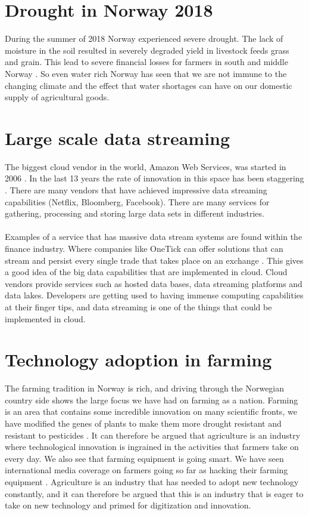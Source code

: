 \documentclass[]{uiophd}
\begin{document}
\section{Drought in Norway 2018}
 During the summer of 2018 Norway experienced severe drought. The lack of moisture in the soil resulted in severely degraded yield in livestock feeds grass and grain. This lead to severe financial losses for farmers in south and middle Norway \cite{nve}. So even water rich Norway has seen that we are not immune to the changing climate and the effect that water shortages can have on our domestic supply of agricultural goods. 

\section{Large scale data streaming }
The biggest cloud vendor in the world, Amazon Web Services, was started in 2006 \cite{Gartner}. In the last 13 years the rate of innovation in this space has been staggering \cite{AWS}. There are many vendors that have achieved impressive data streaming capabilities (Netflix, Bloomberg, Facebook). There are many services for gathering, processing and storing large data sets in different industries.
\\\\
Examples of a service that has massive data stream systems are found within the finance industry. Where companies like OneTick can offer solutions that can stream and persist every single trade that takes place on an exchange  \cite{OneTick}. This gives a good idea of the big data capabilities that are implemented in cloud. Cloud vendors provide services such as hosted data bases, data streaming platforms and data lakes. Developers are getting used to having immense computing capabilities at their finger tips, and data streaming is one of the things that could be implemented in cloud.  
\section{Technology adoption in farming}
The farming tradition in Norway is rich, and driving through the Norwegian country side shows the large focus we have had on farming as a nation. Farming is an area that contains some incredible innovation on many scientific fronts, we have modified the genes of plants to make them more drought resistant and resistant to pesticides \cite{roundup}. It can therefore be argued that agriculture is an industry where technological innovation is ingrained in the activities that farmers take on every day. We also see that farming equipment is going smart. We have seen international media coverage on farmers going so far as hacking their farming equipment \cite{motherboard}. Agriculture is an industry that has needed to adopt new technology constantly, and it can therefore be argued that this is an industry that is eager to take on new technology and primed for digitization and innovation.
\end{document}
